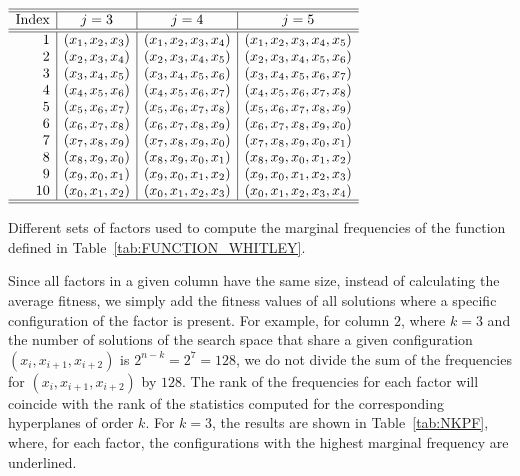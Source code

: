 \documentclass{article} %
\begin{document}
\begin{table}[htb]
\scriptsize
\begin{center}
{$\begin{array}{r|c|c|c} \hline \hline
  \text{Index}  & j=3 & j=4 & j=5  \\  \hline  \hline
  1 &  (x_1,x_2,x_3)  &  (x_1,x_2,x_3,x_4)  &  (x_1,x_2,x_3,x_4,x_5)    \\ 
  2 &  (x_2,x_3,x_4)  &  (x_2,x_3,x_4,x_5)  &  (x_2,x_3,x_4,x_5,x_6)      \\ 
  3 &  (x_3,x_4,x_5)  &  (x_3,x_4,x_5,x_6)  &  (x_3,x_4,x_5,x_6,x_7)  \\ 
  4 &  (x_4,x_5,x_6)  &  (x_4,x_5,x_6,x_7)  &  (x_4,x_5,x_6,x_7,x_8)    \\ 
  5 &  (x_5,x_6,x_7)  & (x_5,x_6,x_7,x_8)  & (x_5,x_6,x_7,x_8,x_9)    \\ 
  6 &  (x_6,x_7,x_8)  &  (x_6,x_7,x_8,x_9)  &  (x_6,x_7,x_8,x_9,x_{0})     \\ 
  7 &  (x_7,x_8,x_9)  &   (x_7,x_8,x_9,x_0)  &  (x_7,x_8,x_9,x_0,x_1)    \\ 
  8 &  (x_8,x_9,x_0)  &  (x_8,x_9,x_0,x_1)  & (x_8,x_9,x_0,x_1,x_2)  \\ 
  9 &  (x_9,x_0,x_1)  &  (x_9,x_0,x_1,x_2)  &  (x_9,x_0,x_1,x_2,x_3)    \\ 
  10&   (x_0,x_1,x_2)  &  (x_0,x_1,x_2,x_3)  &    (x_0,x_1,x_2,x_3,x_4)  \\ \hline  \hline
    \end{array}$}
\caption{Different sets of factors used to compute the marginal frequencies of the function defined in Table~\ref{tab:FUNCTION_WHITLEY}.}
\label{tab:FACTORS_J}
\end{center}
\end{table}


 Since all factors in a given column have the same size, instead of calculating the average fitness, we simply add the fitness values of all solutions where a specific configuration of the factor is present. For example, for column $2$, where $k=3$ and the number of solutions of the search space that share  a given configuration $(x_i,x_{i+1},x_{i+2})$ is $2^{n-k}=2^7=128$, we do not divide the sum of the frequencies for $(x_i,x_{i+1},x_{i+2})$ by $128$.  The rank of the frequencies for each factor will coincide with the rank of the statistics computed for the corresponding hyperplanes of order $k$.  For $k=3$,  the results are shown in Table~\ref{tab:NKPF}, where, for each factor, the configurations with the highest marginal frequency are underlined.  
 
\end{document}
